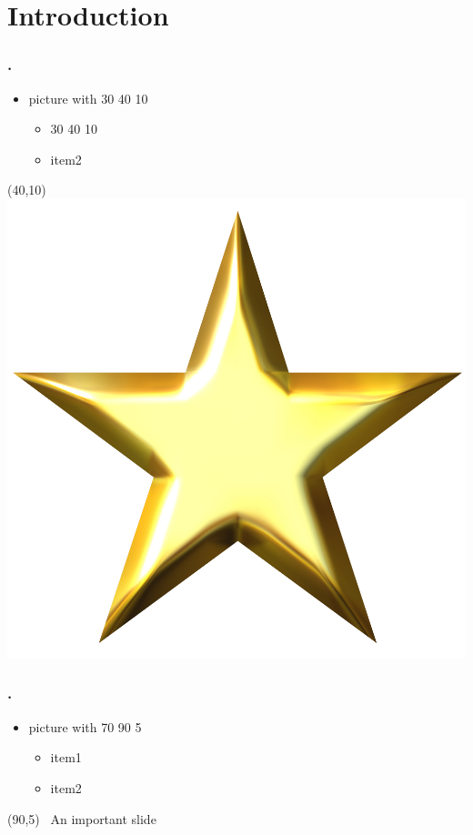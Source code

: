 \documentclass[12pt,t]{beamer}
\newcommand{\markslide}{\textcolor{blue}{\textbullet~}}
\begin{document}
\section{Introduction}
\begin{frame}
\frametitle{\thesection.~\insertsection}
\begin{itemize}
\item picture with 30 40 10
\begin{itemize}
\item 30 40 10 
\item item2
\end{itemize}
\end{itemize}
\begin{textblock}{30}(40,10)
    \includegraphics{star.jpg}
\end{textblock}
\end{frame}


\begin{frame}
\frametitle{\thesection.~\insertsection}
\begin{itemize}
\item picture with 70 90 5
\begin{itemize}
\item item1
\item item2
\end{itemize}
\end{itemize}
\begin{textblock}{70}(90,5)
   {\markslide An important slide}
\end{textblock}
\end{frame}
\end{document}
